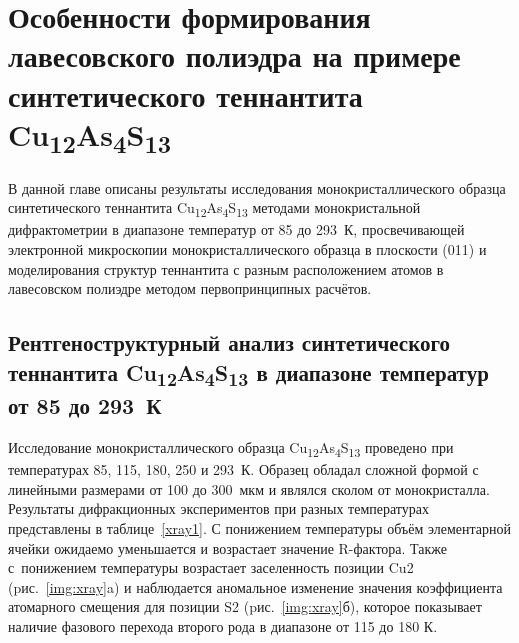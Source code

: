 \chapter{Особенности формирования лавесовского полиэдра на примере синтетического теннантита Cu\textsubscript{12}As\textsubscript{4}S\textsubscript{13}} \label{chapt3}

В данной главе описаны результаты исследования монокристаллического образца синтетического теннантита Cu\textsubscript{12}As\textsubscript{4}S\textsubscript{13} методами монокристальной дифрактометрии в диапазоне температур от 85 до 293~К, просвечивающей электронной микроскопии монокристаллического образца в плоскости (011) и моделирования структур теннантита с разным расположением атомов в лавесовском полиэдре методом первопринципных расчётов.



\section{Рентгеноструктурный анализ синтетического теннантита Cu\textsubscript{12}As\textsubscript{4}S\textsubscript{13} в диапазоне температур от 85 до 293~К} \label{sect3_1}

Исследование монокристаллического образца  Cu\textsubscript{12}As\textsubscript{4}S\textsubscript{13} проведено при температурах 85, 115, 180, 250 и 293~К. Образец обладал сложной формой с линейными размерами от 100 до 300~мкм и являлся сколом от монокристалла.  Результаты дифракционных экспериментов при разных температурах представлены в таблице~\ref{xray1}. С понижением температуры объём элементарной ячейки ожидаемо уменьшается и возрастает значение R-фактора.
Также с~понижением температуры возрастает заселенность позиции Cu2 (pис.~\ref{img:xray}a) и  наблюдается аномальное изменение значения коэффициента атомарного смещения для позиции S2 (pис.~\ref{img:xray}б), которое показывает наличие фазового перехода второго рода в диапазоне от 115 до 180 К.

